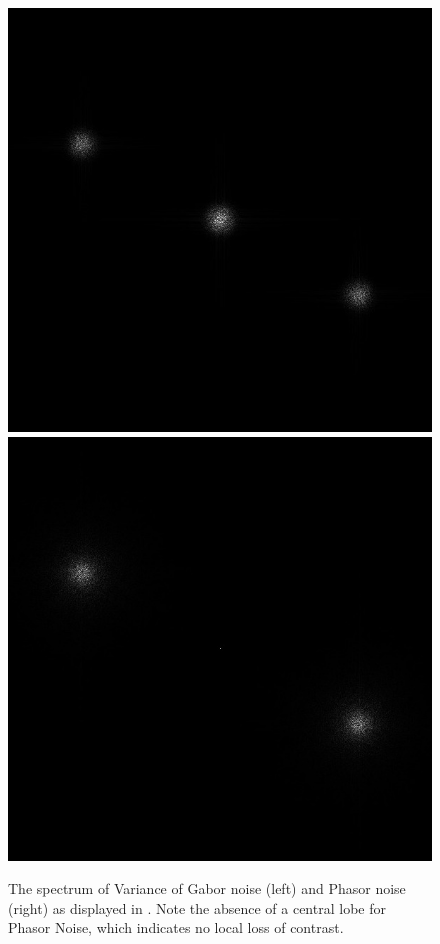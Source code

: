 \documentclass{utue} %
\begin{document}
\begin{figure}[ht]
  \centering
  \includegraphics[width=0.49\linewidth]{images/gaborNoiseSpectrumOfVariance}
  \includegraphics[width=0.49\linewidth]{images/phasorNoiseSpectrumOfVariance}
  \caption{The spectrum of Variance of Gabor noise (left) and Phasor noise (right) as displayed in \cite{phasorNoise}. Note the absence of a central lobe for Phasor Noise, which indicates no local loss of contrast.}\label{fig:spectrumOfVariance}
\end{figure}
\end{document}
